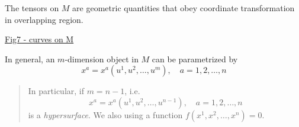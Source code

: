 The tensors on $M$ are geometric quantities that obey coordinate transformation in overlapping region.


\underline{Fig7 - curves on M}

In general, an $m$-dimension object in $M$ can be parametrized by
\begin{equation}
x^{a} = x^{a}\left(u^1,u^2,\ldots,u^m\right), \quad a = 1,2,\ldots,n
\end{equation}


\begin{quote}
	In particular, if $m=n-1$​, i.e.
\begin{equation}
x^{a} = x^{a} \left(u^1,u^2,\ldots,u^{n-1}\right), \quad a = 1,2,\ldots,n
\end{equation}
is a \textit{hypersurface}. We also using a function $f(x^{1},x^{2},\ldots,x^{n})=0$.
\end{quote}

